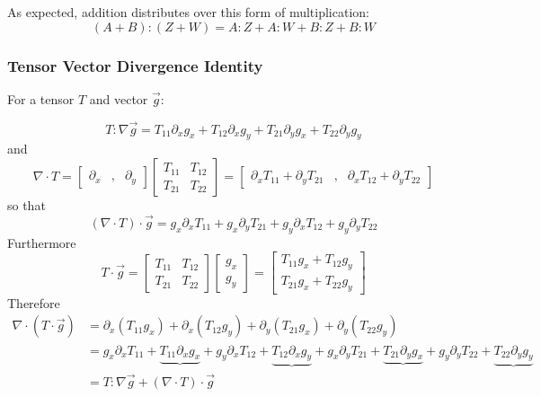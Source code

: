 \documentclass[a4paper]{report}
\begin{document}
As expected, addition distributes over this form of multiplication:
\begin{equation*}
(A + B):(Z + W) = A:Z + A:W + B:Z + B:W
\end{equation*}

\subsubsection*{Tensor Vector Divergence Identity}

For a tensor $T$ and vector $\vec{g}$:

\begin{equation*}
T:\nabla \vec{g} = T_{11}\partial_x g_x + T_{12}\partial_x g_y + T_{21}\partial_y g_x
+ T_{22} \partial_y g_y
\end{equation*}
and
\begin{equation*}
\nabla \cdot T = 
\begin{bmatrix}
\partial_x & , & \partial_y
\end{bmatrix}
\begin{bmatrix}
T_{11} & T_{12} \\
T_{21} & T_{22}
\end{bmatrix} =
\begin{bmatrix}
\partial_x T_{11} + \partial_y T_{21} &,& \partial_x T_{12} + \partial_y T_{22}
\end{bmatrix}
\end{equation*}
so that
\begin{equation*}
(\nabla \cdot T) \cdot \vec{g} = 
g_x \partial_x T_{11} + g_x \partial_y T_{21} + g_y \partial_x T_{12}
 + g_y \partial_y T_{22}
\end{equation*}
 Furthermore
\begin{equation*}
T \cdot \vec{g} = 
\begin{bmatrix}
T_{11} & T_{12} \\
T_{21} & T_{22}
\end{bmatrix}
\begin{bmatrix}
g_x \\
g_y
\end{bmatrix} = 
\begin{bmatrix}
T_{11} g_x + T_{12} g_y \\
T_{21} g_x + T_{22} g_y
\end{bmatrix}
\end{equation*}
Therefore
\begin{align*}
\nabla \cdot (T \cdot \vec{g}) & = 
\partial_x (T_{11} g_x) + \partial_x (T_{12} g_y) +
\partial_y (T_{21} g_x) + \partial_y (T_{22} g_y) \\
 & = g_x \partial_x T_{11} + \underbrace{T_{11} \partial_x g_x} +
     g_y \partial_x T_{12} + \underbrace{T_{12} \partial_x g_y} +
     g_x \partial_y T_{21} + \underbrace{T_{21} \partial_y g_x} +
     g_y \partial_y T_{22} + \underbrace{T_{22} \partial_y g_y} \\
 & = T:\nabla \vec{g} + (\nabla \cdot T) \cdot \vec{g}
\end{align*}
\end{document}
